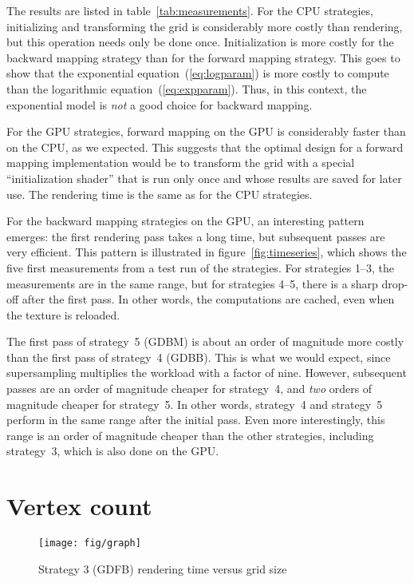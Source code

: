 \documentclass[english,12pt]{ifimaster}
\begin{document}
The results are listed in table~\ref{tab:measurements}. For the CPU
strategies, initializing and transforming the grid is considerably
more costly than rendering, but this operation needs only be done
once. Initialization is more costly for the backward mapping strategy
than for the forward mapping strategy. This goes to show that the
exponential equation~(\ref{eq:logparam}) is more costly to compute
than the logarithmic equation~(\ref{eq:expparam}). Thus, in this
context, the exponential model is \emph{not} a good choice for
backward mapping.

For the GPU strategies, forward mapping on the GPU is considerably
faster than on the CPU, as we expected. This suggests that the optimal
design for a forward mapping implementation would be to transform the
grid with a special ``initialization shader'' that is run only once
and whose results are saved for later use. The rendering time is the
same as for the CPU strategies.

For the backward mapping strategies on the GPU, an interesting pattern
emerges: the first rendering pass takes a long time, but subsequent
passes are very efficient. This pattern is illustrated in
figure~\ref{fig:timeseries}, which shows the five first measurements
from a test run of the strategies. For strategies 1--3, the
measurements are in the same range, but for strategies 4--5, there is
a sharp drop-off after the first pass. In other words, the
computations are cached, even when the texture is reloaded.

The first pass of strategy~5 (GDBM) is about an order of magnitude
more costly than the first pass of strategy~4 (GDBB). This is what we
would expect, since supersampling multiplies the workload with a
factor of nine. However, subsequent passes are an order of magnitude
cheaper for strategy~4, and \emph{two} orders of magnitude cheaper for
strategy~5. In other words, strategy~4 and strategy~5 perform in the
same range after the initial pass. Even more interestingly, this range
is an order of magnitude cheaper than the other strategies, including
strategy~3, which is also done on the GPU.

\section{Vertex count}
\label{sec:vertexcount}

\begin{figure}[b]
  \centering
  \texttt{[image: fig/graph]}
  \caption{Strategy 3 (GDFB) rendering time versus grid size}
  \label{fig:strategy3graph}
\end{figure}
\end{document}
